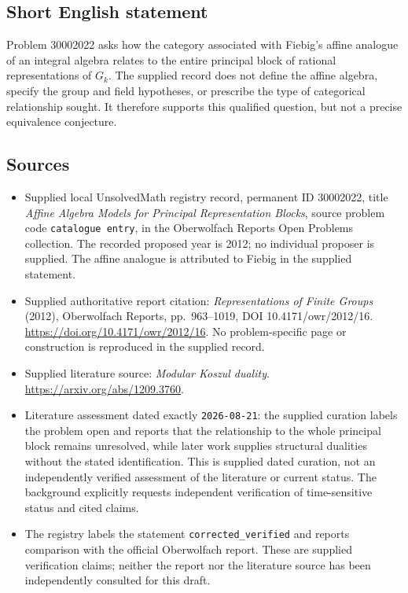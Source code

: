 \documentclass[11pt]{article}
\begin{document}
\subsection{Short English statement}
Problem 30002022 asks how the category associated with Fiebig's affine analogue of an integral algebra relates to the entire principal block of rational representations of \(G_k\). The supplied record does not define the affine algebra, specify the group and field hypotheses, or prescribe the type of categorical relationship sought. It therefore supports this qualified question, but not a precise equivalence conjecture.
\subsection{Sources}
\begin{itemize}
\item Supplied local UnsolvedMath registry record, permanent ID 30002022, title \emph{Affine Algebra Models for Principal Representation Blocks}, source problem code \texttt{catalogue entry}, in the Oberwolfach Reports Open Problems collection. The recorded proposed year is 2012; no individual proposer is supplied. The affine analogue is attributed to Fiebig in the supplied statement.
\item Supplied authoritative report citation: \emph{Representations of Finite Groups} (2012), Oberwolfach Reports, pp.\ 963--1019, DOI 10.4171/owr/2012/16. \url{https://doi.org/10.4171/owr/2012/16}. No problem-specific page or construction is reproduced in the supplied record.
\item Supplied literature source: \emph{Modular Koszul duality}. \url{https://arxiv.org/abs/1209.3760}.
\item Literature assessment dated exactly \texttt{2026-08-21}: the supplied curation labels the problem open and reports that the relationship to the whole principal block remains unresolved, while later work supplies structural dualities without the stated identification. This is supplied dated curation, not an independently verified assessment of the literature or current status. The background explicitly requests independent verification of time-sensitive status and cited claims.
\item The registry labels the statement \texttt{corrected\_verified} and reports comparison with the official Oberwolfach report. These are supplied verification claims; neither the report nor the literature source has been independently consulted for this draft.
\end{itemize}
\end{document}
